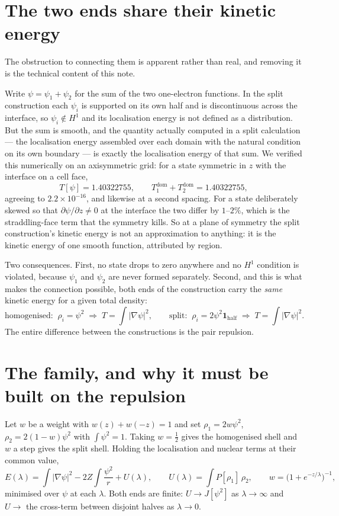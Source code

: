 \documentclass[11pt]{article}
\newcommand{\half}{\tfrac12}
\newcommand{\grad}{\nabla}
\begin{document}
\section{The two ends share their kinetic energy}\label{sec:kinetic}

The obstruction to connecting them is apparent rather than real, and removing it is the technical
content of this note.

Write $\psi=\psi_1+\psi_2$ for the sum of the two one-electron functions. In the split construction
each $\psi_i$ is supported on its own half and is discontinuous across the interface, so
$\psi_i\notin H^1$ and its localisation energy is not defined as a distribution. But the sum is
smooth, and the quantity actually computed in a split calculation --- the localisation energy
assembled over each domain with the natural condition on its own boundary --- is exactly the
localisation energy of that sum. We verified this numerically on an axisymmetric grid: for a state
symmetric in $z$ with the interface on a cell face,
\[
  T[\psi] = 1.40322755, \qquad T_1^{\text{dom}}+T_2^{\text{dom}} = 1.40322755,
\]
agreeing to $2.2\times10^{-16}$, and likewise at a second spacing. For a state deliberately skewed so
that $\partial\psi/\partial z\neq0$ at the interface the two differ by $1$--$2\%$, which is the
straddling-face term that the symmetry kills. So at a plane of symmetry the split construction's
kinetic energy is not an approximation to anything: it is the kinetic energy of one smooth function,
attributed by region.

Two consequences. First, no state drops to zero anywhere and no $H^1$ condition is violated, because
$\psi_1$ and $\psi_2$ are never formed separately. Second, and this is what makes the connection
possible, both ends of the construction carry the \emph{same} kinetic energy for a given total
density:
\[
  \text{homogenised:}\;\; \rho_i=\psi^2 \;\Rightarrow\; T=\!\int\!|\grad\psi|^2,
  \qquad
  \text{split:}\;\; \rho_i=2\psi^2\mathbf{1}_{\text{half}} \;\Rightarrow\; T=\!\int\!|\grad\psi|^2 .
\]
The entire difference between the constructions is the pair repulsion.

\section{The family, and why it must be built on the repulsion}

Let $w$ be a weight with $w(z)+w(-z)=1$ and set $\rho_1=2w\psi^2$, $\rho_2=2(1-w)\psi^2$ with
$\int\psi^2=1$. Taking $w=\half$ gives the homogenised shell and $w$ a step gives the split shell.
Holding the localisation and nuclear terms at their common value,
\begin{equation}\label{eq:family}
  E(\lambda)=\int|\grad\psi|^2-2Z\!\int\!\frac{\psi^2}{r}+U(\lambda),
  \qquad U(\lambda)=\!\int\! P[\rho_1]\,\rho_2 ,
  \qquad w=\bigl(1+e^{-z/\lambda}\bigr)^{-1},
\end{equation}
minimised over $\psi$ at each $\lambda$. Both ends are finite: $U\to J[\psi^2]$ as
$\lambda\to\infty$ and $U\to$ the cross-term between disjoint halves as $\lambda\to0$.
\end{document}
